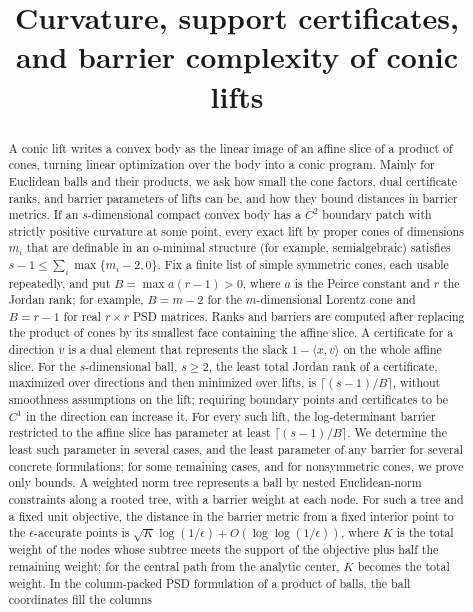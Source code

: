 \documentclass[11pt]{article}
\title{Curvature, support certificates, and barrier complexity of conic lifts}
\author{}
\date{}
\begin{document}
\maketitle
\begin{abstract}
A conic lift writes a convex body as the linear image of an affine slice
of a product of cones, turning linear optimization over the body into a
conic program. Mainly for Euclidean balls and their products, we ask how
small the cone factors, dual certificate ranks, and barrier parameters
of lifts can be, and how they bound distances in barrier metrics. If an
$s$-dimensional compact convex body has a $C^2$ boundary patch with
strictly positive curvature at some point, every exact lift by proper
cones of dimensions $m_i$ that are definable in an o-minimal structure
(for example, semialgebraic) satisfies
$s-1\leq\sum_i\max\{m_i-2,0\}$. Fix a finite list of simple symmetric
cones, each usable repeatedly, and put $B=\max a(r-1)>0$, where $a$ is
the Peirce constant and $r$ the Jordan rank; for example, $B=m-2$ for
the $m$-dimensional Lorentz cone and $B=r-1$ for real $r\times r$ PSD
matrices. Ranks and barriers are computed after replacing the product of cones by its smallest face containing the affine slice. A certificate for a direction $v$ is a dual element that represents the slack $1-\langle
x,v\rangle$ on the whole affine slice. For the $s$-dimensional ball,
$s\geq2$, the least total Jordan rank of a certificate, maximized over
directions and then minimized over lifts, is $\lceil(s-1)/B\rceil$,
without smoothness assumptions on the lift; requiring boundary points
and certificates to be $C^1$ in the direction can increase it. For every
such lift, the log-determinant barrier restricted to the affine slice
has parameter at least $\lceil(s-1)/B\rceil$. We determine the least
such parameter in several cases, and the least parameter of any barrier
for several concrete formulations; for some remaining cases, and for
nonsymmetric cones, we prove only bounds. A weighted norm tree
represents a ball by nested Euclidean-norm constraints along a rooted
tree, with a barrier weight at each node. For such a tree and a fixed
unit objective, the distance in the barrier metric from a fixed interior point to the $\epsilon$-accurate
points is $\sqrt{K}\log(1/\epsilon)+O(\log\log(1/\epsilon))$, where $K$
is the total weight of the nodes whose subtree meets the support of the
objective plus half the remaining weight; for the central path from the
analytic center, $K$ becomes the total weight. In the column-packed PSD
formulation of a product of balls, the ball coordinates fill the columns

\end{abstract}
\end{document}
